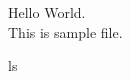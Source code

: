 \documentclass{article}
\begin{document}
 Hello World.\\
 This is sample file.

ls
\\
\\\
\end{document}
